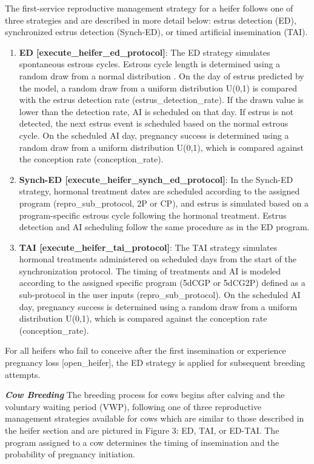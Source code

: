 \documentclass{article}
\begin{document}
\begin{refsection}
    The first-service reproductive management strategy for a heifer follows one of three strategies and are described in more detail below: estrus detection (ED), synchronized estrus detection (Synch-ED), or timed artificial insemination (TAI).
    \begin{enumerate}
        \item \textbf{ED [execute\_heifer\_ed\_protocol]}: The ED strategy simulates spontaneous estrous cycles. Estrous cycle length is determined using a random draw from a normal distribution \parencite{devries2006}. On the day of estrus predicted by the model, a random draw from a uniform distribution U(0,1) is compared with the estrus detection rate (estrus\_detection\_rate). If the drawn value is lower than the detection rate, AI is scheduled on that day. If estrus is not detected, the next estrus event is scheduled based on the normal estrous cycle. On the scheduled AI day, pregnancy success is determined using a random draw from a uniform distribution U(0,1), which is compared against the conception rate (conception\_rate).
        \item \textbf {Synch-ED [execute\_heifer\_synch\_ed\_protocol]}: In the Synch-ED strategy, hormonal treatment dates are scheduled according to the assigned program (repro\_sub\_protocol, 2P or CP), and estrus is simulated based on a program-specific estrous cycle following the hormonal treatment. Estrus detection and AI scheduling follow the same procedure as in the ED program. 
        \item \textbf{TAI [execute\_heifer\_tai\_protocol]}: The TAI strategy simulates hormonal treatments administered on scheduled days from the start of the synchronization protocol. The timing of treatments and AI is modeled according to the assigned specific program (5dCGP or 5dCG2P) defined as a sub-protocol in the user inputs (repro\_sub\_protocol). On the scheduled AI day, pregnancy success is determined using a random draw from a uniform distribution U(0,1), which is compared against the conception rate (conception\_rate).
    \end{enumerate}
    For all heifers who fail to conceive after the first insemination or experience pregnancy loss [open\_heifer], the ED strategy is applied for subsequent breeding attempts.
    
    \textbf{\textit{Cow Breeding}} The breeding process for cows begins after calving and the voluntary waiting period (VWP), following one of three reproductive management strategies available for cows which are similar to those described in the heifer section and are pictured in Figure 3: ED, TAI, or ED-TAI. The program assigned to a cow determines the timing of insemination and the probability of pregnancy initiation.
    \vspace{-0.5cm}


\end{refsection}
\end{document}
